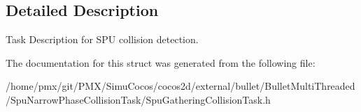 \subsection{Detailed Description}
Task Description for S\+PU collision detection. 

The documentation for this struct was generated from the following file\+:\begin{DoxyCompactItemize}
\item 
/home/pmx/git/\+P\+M\+X/\+Simu\+Cocos/cocos2d/external/bullet/\+Bullet\+Multi\+Threaded/\+Spu\+Narrow\+Phase\+Collision\+Task/Spu\+Gathering\+Collision\+Task.\+h\end{DoxyCompactItemize}

